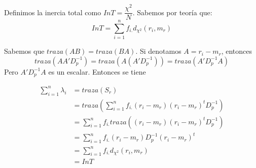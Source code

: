 \documentclass[twoside]{article}
\begin{document}
\begin{enumerate}
Definimos la inercia total como $InT = \dfrac{\chi^2}{N}$. Sabemos por teoría que:
$$
InT = \sum_{i=1}^n f_{i.}d_{\chi^2}(r_i,m_r)
$$


Sabemos que $traza(AB)=traza(BA)$. Si denotamos $A=r_i - m_r$, entonces
$$
traza(AA'D_p^{-1}) = traza(A(A'D_p^{-1})) = traza(A'D_p^{-1}A)
$$
Pero $A'D_p^{-1}A$ es un escalar. Entonces se tiene

\begin{align*}
\sum_{i=1}^n \lambda_i & = traza(S_r)\\
&=traza\left(\sum_{i=1}^n f_{i.} (r_i - m_r) (r_i - m_r)^t D_p^{-1} \right)\\
&= \sum_{i=1}^n f_{i.} traza((r_i - m_r) (r_i - m_r)^t D_p^{-1})\\
& = \sum_{i=1}^n f_{i.}(r_i - m_r) D_p^{-1} (r_i - m_r)^t \\
&= \sum_{i=1}^n f_{i.}d_{\chi^2}(r_i,m_r)\\
& = InT
\end{align*}

\end{enumerate}
\newpage
\end{document}

